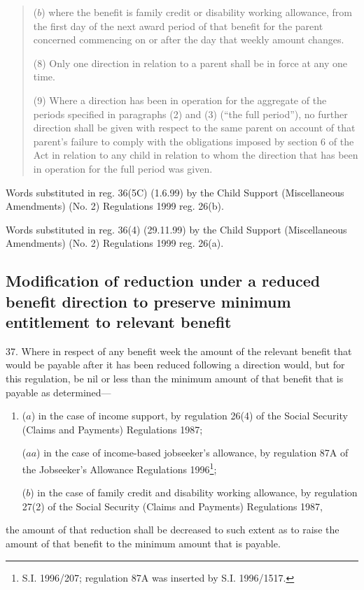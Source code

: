 \documentclass[a4paper,12pt]{article}
\begin{document}
{\begin{quotation}
\begin{enumerate}
($b$) where the benefit is family credit or disability working allowance, from the first day of the next award period of that benefit for the parent concerned commencing on or after the day that weekly amount changes.
\end{enumerate}

(8) Only one direction in relation to a parent shall be in force at any one time.

(9) Where a direction has been in operation for the aggregate of the periods specified in paragraphs (2) and (3) (“the full period”), no further direction shall be given with respect to the same parent on account of that parent’s failure to comply with the obligations imposed by section 6 of the Act in relation to any child in relation to whom the direction that has been in operation for the full period was given.
\end{quotation}

Words substituted in reg. 36(5C) (1.6.99) by the Child Support (Miscellaneous Amendments) (No. 2) Regulations 1999 reg. 26(b).

Words substituted in reg. 36(4) (29.11.99) by the Child Support (Miscellaneous Amendments) (No. 2) Regulations 1999 reg. 26(a).
}

\subsection[37. Modification of reduction under a reduced benefit direction to preserve minimum entitlement to relevant benefit]{Modification of reduction under a reduced benefit direction to preserve minimum entitlement to relevant benefit}

37.  Where in respect of any benefit week the amount of the relevant benefit that would be payable after it has been reduced following a direction would, but for this regulation, be nil or less than the minimum amount of that benefit that is payable as determined—
\begin{enumerate}\item[]
($a$) in the case of income support, by regulation 26(4) of the Social Security (Claims and Payments) Regulations 1987;

($aa$) in the case of income-based jobseeker’s allowance, by regulation 
87A of the Jobseeker’s Allowance Regulations 1996\footnote{\frenchspacing S.I. 1996/207; regulation 87A was inserted by S.I. 1996/1517.};  %

($b$) in the case of family credit and disability working allowance, by regulation 27(2) 
of the Social Security (Claims and Payments) Regulations 1987,  %
\end{enumerate}
the amount of that reduction shall be decreased to such extent as to raise the amount of that benefit to the minimum amount that is payable.
\end{document}
